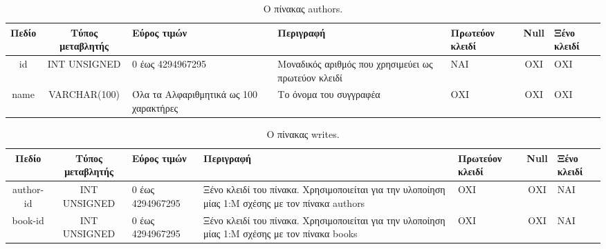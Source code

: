 \documentclass{assignment}
\begin{document}
\begin{landscape}
\begin{table}[htbp]
\begin{center}
  \begin{tabular}{|c|c|m{}|m{}|m{2.0cm}|c|m{1.5cm}|}
    \hline
    {\bf Πεδίο} & {\bf Τύπος μεταβλητής} & {\bf Εύρος τιμών} & {\bf Περιγραφή} & {\bf Πρωτεύον κλειδί} & {\bf Null} & {\bf Ξένο κλειδί} \\ \hline
    id & INT UNSIGNED & 0 έως 4294967295 & Μοναδικός αριθμός που χρησιμεύει ως πρωτεύον κλειδί & ΝΑΙ & ΟΧΙ & ΟΧΙ \\ \hline
    name & VARCHAR(100) & Όλα τα Αλφαριθμητικά ως 100 χαρακτήρες & Το όνομα του συγγραφέα & ΟΧΙ & ΟΧΙ & ΟΧΙ \\ \hline
  \end{tabular}
\caption{Ο πίνακας authors.}
\label{table:db_table:authors}
\end{center}
\end{table}

\begin{table}[htbp]
\begin{center}
  \begin{tabular}{|c|c|m{}|m{}|m{2.0cm}|c|m{1.5cm}|}
    \hline
    {\bf Πεδίο} & {\bf Τύπος μεταβλητής} & {\bf Εύρος τιμών} & {\bf Περιγραφή} & {\bf Πρωτεύον κλειδί} & {\bf Null} & {\bf Ξένο κλειδί} \\ \hline
    author-id & INT UNSIGNED & 0 έως 4294967295 & Ξένο κλειδί του πίνακα. Χρησιμοποιείται για την υλοποίηση μίας 1:Μ σχέσης με τον πίνακα authors & OXI & ΟΧΙ & NAI \\ \hline
    book-id & INT UNSIGNED & 0 έως 4294967295 & Ξένο κλειδί του πίνακα. Χρησιμοποιείται για την υλοποίηση μίας 1:Μ σχέσης με τον πίνακα books & OXI & ΟΧΙ & NAI \\ \hline
  \end{tabular}
\caption{Ο πίνακας writes.}
\label{table:db_table:writes}
\end{center}
\end{table}
\end{landscape}
\end{document}
